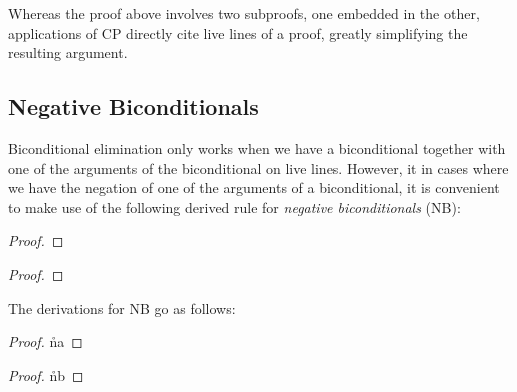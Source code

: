 Whereas the proof above involves two subproofs, one embedded in the other, applications of CP directly cite live lines of a proof, greatly simplifying the resulting argument.





\subsection{Negative Biconditionals}

Biconditional elimination only works when we have a biconditional together with one of the arguments of the biconditional on live lines.
However, it in cases where we have the negation of one of the arguments of a biconditional, it is convenient to make use of the following derived rule for \textit{negative biconditionals} (NB):

\begin{multicols}{2}

\begin{proof}
\end{proof}

\begin{proof}
\end{proof}

\end{multicols}

The derivations for NB go as follows:

\begin{multicols}{2}

\begin{proof}
  \open 
     \as{}
     
     \r{na}
  \close
   
\end{proof}

\begin{proof}
  \open 
     \as{}
     
     \r{nb}
  \close
   
\end{proof}

\end{multicols}



